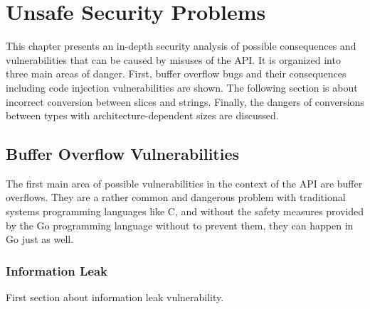 
\chapter{Unsafe Security Problems}\label{ch:unsafe-security-problems}

This chapter presents an in-depth security analysis of possible consequences and vulnerabilities that can be caused by
misuses of the \unsafe{} \acrshort{API}.
It is organized into three main areas of danger.
First, buffer overflow bugs and their consequences including code injection vulnerabilities are shown.
The following section is about incorrect conversion between slices and strings.
Finally, the dangers of conversions between types with architecture-dependent sizes are discussed.





\section{Buffer Overflow Vulnerabilities}\label{sec:unsafe-security-problems:buffer-overflow}

The first main area of possible vulnerabilities in the context of the \unsafe{} \acrshort{API} are buffer overflows.
They are a rather common and dangerous problem with traditional systems programming languages like C, and without the
safety measures provided by the Go programming language without \unsafe{} to prevent them, they can happen in Go just
as well.



\subsection{Information Leak}\label{subsec:unsafe-security-problems:buffer-overflow:information-leak}

First section about information leak vulnerability.



